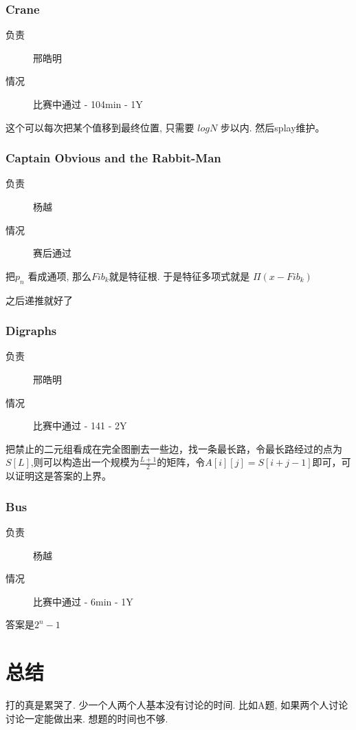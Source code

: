 \documentclass[a4paper, 11pt, nofonts, nocap, fancyhdr]{ctexart}
\newcommand{\problem}[1]{\subsubsection{#1}}
\begin{document}
\problem{Crane}

\begin{description}
\item[负责] 邢皓明
\item[情况] 比赛中通过 - 104min - 1Y
\end{description}

这个可以每次把某个值移到最终位置, 只需要 $log N$ 步以内. 然后splay维护。 

\problem{Captain Obvious and the Rabbit-Man}

\begin{description}
\item[负责] 杨越
\item[情况] 赛后通过
\end{description}

把$p_n$ 看成通项, 那么$Fib_k$就是特征根. 于是特征多项式就是 $\Pi (x-Fib_k)$

之后递推就好了

\problem{Digraphs}

\begin{description}
\item[负责] 邢皓明
\item[情况] 比赛中通过 - 141 - 2Y
\end{description}

把禁止的二元组看成在完全图删去一些边，找一条最长路，令最长路经过的点为$S[L]$,则可以构造出一个规模为$\frac{L+1}{2}$的矩阵，令$A[i][j] = S[i + j - 1]$即可，可以证明这是答案的上界。

\problem{Bus}

\begin{description}
\item[负责] 杨越
\item[情况] 比赛中通过 - 6min - 1Y
\end{description}

答案是$2^n-1$

\section{总结}

打的真是累哭了. 少一个人两个人基本没有讨论的时间. 比如A题, 如果两个人讨论讨论一定能做出来. 想题的时间也不够. 
\end{document}
